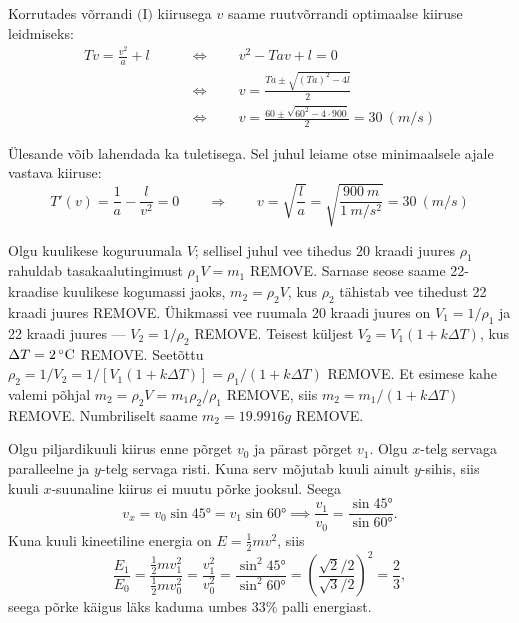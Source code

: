 \documentclass[10pt]{article}
\newcommand{\p}[1]{REMOVE}
\begin{document}
Korrutades võrrandi $\text{(I)}$ kiirusega $v$ saame ruutvõrrandi optimaalse kiiruse leidmiseks:
\begin{align*}
    Tv = \frac{v^2}{a}+l \qquad &\Longleftrightarrow \qquad v^2 - Tav + l = 0 \\
                                &\Longleftrightarrow \qquad v = \frac{Ta \pm \sqrt{(Ta)^2 - 4l}}{2} \\
                                &\Longleftrightarrow \qquad v = \frac{60 \pm \sqrt{60^2 - 4\cdot 900}}{2} = \SI{30}{(m/s)}
\end{align*}

Ülesande võib lahendada ka tuletisega. Sel juhul leiame otse minimaalsele ajale vastava kiiruse:
$$
T'(v) = \frac{1}{a}-\frac{l}{v^2} = 0 \qquad \Longrightarrow \qquad v = \sqrt{\frac{l}{a}} = \sqrt{\frac{\SI{900}{m}}{\SI{1}{m/s^2}}} = \SI{30}{(m/s)}
$$
\probend
\bigskip


\solu
Olgu kuulikese koguruumala $V$; sellisel juhul vee tihedus 20 kraadi juures $\rho_1$ rahuldab tasakaalutingimust $\rho_1V=m_1$ \p{1}. Sarnase seose saame 22-kraadise kuulikese kogumassi jaoks, $m_2=\rho_2V$, kus  $\rho_2$ tähistab vee tihedust 22 kraadi juures \p{1}. Ühikmassi vee ruumala 20 kraadi juures on $V_1=1/\rho_1$ ja 22 kraadi juures ---  $V_2=1/\rho_2$ \p{1}. Teisest küljest $V_2=V_1(1+k\Delta T)$, kus $\Delta T=\SI 2\celsius$ \p{1}. Seetõttu $\rho_2=1/V_2=1/[V_1(1+k\Delta T)]=\rho_1/(1+k\Delta T)$ \p{1}. Et  esimese kahe valemi põhjal $m_2=\rho_2V=m_1\rho_2/\rho_1$ \p{1}, siis  $m_2=m_1/(1 + k\Delta T) $ \p{1}. Numbriliselt saame $m_2= \SI{19.9916}g$ \p{1}.
\probend
\bigskip


\solu
\par
\osa Olgu piljardikuuli kiirus enne põrget $v_0$ ja pärast põrget $v_1$. Olgu $x$-telg servaga paralleelne ja $y$-telg servaga risti. Kuna serv mõjutab kuuli ainult $y$-sihis, siis kuuli $x$-suunaline kiirus ei muutu põrke jooksul. Seega
\begin{equation*}
    v_x = v_0\sin\ang{45} = v_1\sin\ang{60} \implies \frac{v_1}{v_0} = \frac{\sin\ang{45}}{\sin\ang{60}}.
\end{equation*}
Kuna kuuli kineetiline energia on $E = \frac{1}{2}mv^2$, siis
\begin{equation*}
    \frac{E_1}{E_0} = \frac{\frac{1}{2}mv_1^2}{\frac{1}{2}mv_0^2} = \frac{v_1^2}{v_0^2} = \frac{\sin^2\ang{45}}{\sin^2\ang{60}} = \left(\frac{\sqrt{2}/2}{\sqrt{3}/2}\right)^2 = \frac{2}{3},
\end{equation*}
seega põrke käigus läks kaduma umbes $33\%$ palli energiast.
\end{document}
